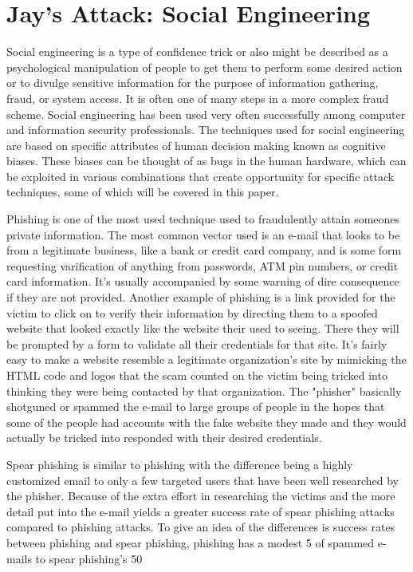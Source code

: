 \section{Jay's Attack: Social Engineering}

Social engineering is a type of confidence trick or also might be described as a psychological manipulation of people to get them to perform some desired action or to
divulge sensitive information for the purpose of information gathering, fraud, or system access. It is often one of many steps in a more complex fraud scheme.
Social engineering has been used very often successfully among computer and information security professionals.
The techniques used for social engineering are based on specific attributes of human decision making known as cognitive biases. These biases can be thought of as bugs
in the human hardware, which can be exploited in various combinations that create opportunity for specific attack techniques, some of which will be covered in this
paper.

Phishing is one of the most used technique used to fraudulently attain someones private information. The most common vector used is an e-mail that looks to be from a
legitimate business, like a bank or credit card company, and is some form requesting varification of anything from passwords, ATM pin numbers, or credit card
information. It's usually accompanied by some warning of dire consequence if they are not provided. Another example of phishing is a link provided for the victim to
click on to verify their information by directing them to a spoofed website that looked exactly like the website their used to seeing. There they will be prompted by
a form to validate all their credentials for that site. It's fairly easy to make a website resemble a legitimate organization's site by mimicking the HTML code and
logos that the scam counted on the victim being tricked into thinking they were being contacted by that organization. The "phisher" basically shotguned or spammed
the e-mail to large groups of people in the hopes that some of the people had accounts with the fake website they made and they would actually be tricked into
responded with their desired credentials.

Spear phishing is similar to phishing with the difference being a highly customized email to only a few targeted users that have been well researched by the phisher.
Because of the extra effort in researching the victims and the more detail put into the e-mail yields a greater success rate of spear phishing attacks compared to
phishing attacks. To give an idea of the differences is success rates between phishing and spear phishing, phishing has a modest 5%
of spammed e-mails to spear phishing's 50%

